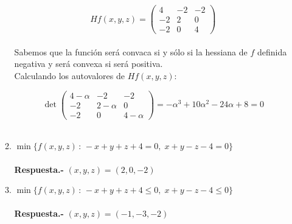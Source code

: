 \begin{enumerate}
\begin{enumerate}[\bfseries a)]
		$$Hf(x,y,z) = \begin{pmatrix}
		    4&-2&-2\\
		     -2&2&0\\
		       -2&0&4
		\end{pmatrix}$$\\

		Sabemos que la función será convaca si y sólo si la hessiana de $f$ definida negativa y será convexa si será positiva.\\

		Calculando los autovalores de $Hf(x,y,z):$


		$$\det\begin{pmatrix}
		    4-\alpha&-2&-2\\
		     -2&2-\alpha&0\\
		       -2&0&4-\alpha
		\end{pmatrix} = -\alpha^3 + 10\alpha^2 - 24\alpha + 8=0$$\\

	    \item $\min\lbrace f(x,y,z) \, : \, -x+y+z+4=0,\; x+y-z-4=0\rbrace$\\\\
		\textbf{Respuesta.-}\; $(x,y,z)=(2,0,-2)$

	    \item $\min \lbrace f(x,y,z) \, : \, -x+y+z+4\leq 0,\; x+y-z-4\leq 0 \rbrace$\\\\
		\textbf{Respuesta.-}\; $(x,y,z) = (-1,-3,-2)$


	\end{enumerate}

\end{enumerate}




